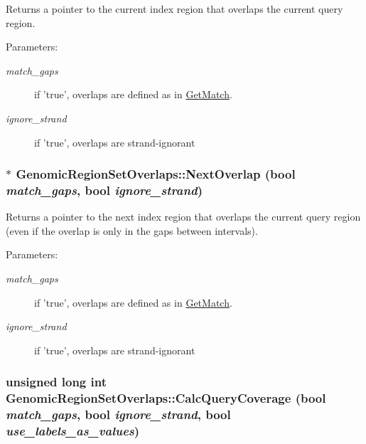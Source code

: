 Returns a pointer to the current index region that overlaps the current query region. 

\begin{Desc}
\item[Parameters:]
\begin{description}
\item[{\em match\_\-gaps}]if 'true', overlaps are defined as in \hyperlink{classGenomicRegionSetOverlaps_e6d1c3bd67b0a902649aab01909a9c10}{GetMatch}. \item[{\em ignore\_\-strand}]if 'true', overlaps are strand-ignorant \end{description}
\end{Desc}
\hypertarget{classGenomicRegionSetOverlaps_2fa112eab38f07e7bc75ac76f5b9fc67}{
\subsubsection[NextOverlap]{ $\ast$ GenomicRegionSetOverlaps::NextOverlap (bool {\em match\_\-gaps}, \/  bool {\em ignore\_\-strand})}}
\label{classGenomicRegionSetOverlaps_2fa112eab38f07e7bc75ac76f5b9fc67}


Returns a pointer to the next index region that overlaps the current query region (even if the overlap is only in the gaps between intervals). 

\begin{Desc}
\item[Parameters:]
\begin{description}
\item[{\em match\_\-gaps}]if 'true', overlaps are defined as in \hyperlink{classGenomicRegionSetOverlaps_e6d1c3bd67b0a902649aab01909a9c10}{GetMatch}. \item[{\em ignore\_\-strand}]if 'true', overlaps are strand-ignorant \end{description}
\end{Desc}
\hypertarget{classGenomicRegionSetOverlaps_1e30ae0e49423a432b7a1d3e3ff09011}{
\subsubsection[CalcQueryCoverage]{\setlength{\rightskip}{0pt plus 5cm}unsigned long int GenomicRegionSetOverlaps::CalcQueryCoverage (bool {\em match\_\-gaps}, \/  bool {\em ignore\_\-strand}, \/  bool {\em use\_\-labels\_\-as\_\-values})}}
\label{classGenomicRegionSetOverlaps_1e30ae0e49423a432b7a1d3e3ff09011}


